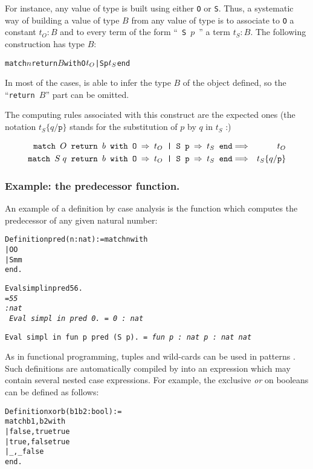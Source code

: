 \documentclass[11pt]{article}
\newcommand{\refmancite}[1]{{}}
\begin{document}
For instance, any value of type {\nat} is built using either \texttt{O} or \texttt{S}.
Thus, a systematic way of building a value of type $B$ from any 
value of type {\nat} is to associate to \texttt{O} a constant $t_O:B$ and
to every term of the form ``~\texttt{S $p$}~'' a term $t_S:B$. The following
construction has type $B$:
\begin{alltt}
match \(n\) return \(B\) with O \funarrow \(t\sb{O}\) | S p \funarrow \(t\sb{S}\) end
\end{alltt}


In most of the cases, {\coq} is able to infer the type $B$ of the object
defined, so the ``\texttt{return $B$}'' part can be omitted.

The computing rules associated with this construct are the expected ones 
(the notation $t_S\{q/\texttt{p}\}$ stands for the substitution of $p$ by
$q$ in $t_S$ :)

\begin{eqnarray*}
\texttt{match $O$ return $b$ with O {\mbox{$\Rightarrow$}} $t_O$ | S p {\mbox{$\Rightarrow$}} $t_S$ end} &\Longrightarrow& t_O\\
\texttt{match $S\;q$  return $b$ with O {\mbox{$\Rightarrow$}} $t_O$ | S p {\mbox{$\Rightarrow$}} $t_S$ end}  &\Longrightarrow& t_S\{q/\texttt{p}\}
\end{eqnarray*}


\subsubsection{Example: the predecessor function.}\label{firstpred}
An example of a definition by case analysis is the function which
computes the predecessor of any given natural number:
\begin{alltt}
Definition pred (n:nat) := match n with
                                   | O {\funarrow} O 
                                   | S m {\funarrow} m 
                           end.

Eval simpl in pred 56.
\it{}    = 55
     : nat
\tt
Eval simpl in pred 0.
\it{}    = 0
     : nat

\tt{}Eval simpl in fun p {\funarrow} pred (S p).
\it{}     = fun p : nat {\funarrow} p
     : nat {\arrow} nat
\end{alltt}

As in functional programming, tuples and wild-cards can be used in
patterns \refmancite{Section \ref{ExtensionsOfCases}}. Such
definitions are automatically compiled by {\coq} into an expression which
may contain several nested case expressions. For example, the 
exclusive \emph{or} on booleans can be defined as follows:
\begin{alltt}
Definition xorb (b1 b2:bool) :=
 match b1, b2 with 
 | false, true {\funarrow} true
 | true, false {\funarrow} true
 | _ , _       {\funarrow} false
 end.
\end{alltt}
\end{document}
